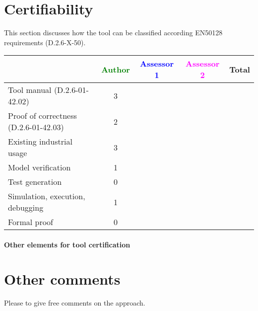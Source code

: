 \section{Certifiability}

This section discusses how the tool can be classified according EN50128 requirements (D.2.6-X-50).


\begin{tabular}{|l | c | c | c | c|}
\hline
& \textcolor{green}{Author} & \textcolor{blue}{Assessor 1} & \textcolor{magenta}{Assessor 2} & Total \\
\hline 
Tool manual (D.2.6-01-42.02) &3 & & &  \\
\hline
Proof of correctness (D.2.6-01-42.03)   &2 & & & \\
\hline
Existing industrial  usage  &3 & & & \\
\hline
Model verification &1 & & & \\
\hline
Test generation &0 & & & \\
\hline
Simulation, execution, debugging &1 & & & \\
\hline
Formal proof &0 & & & \\
\hline
\end{tabular}

\paragraph{Other elements for tool certification}

\section{Other comments}
Please to  give free comments on the approach.



